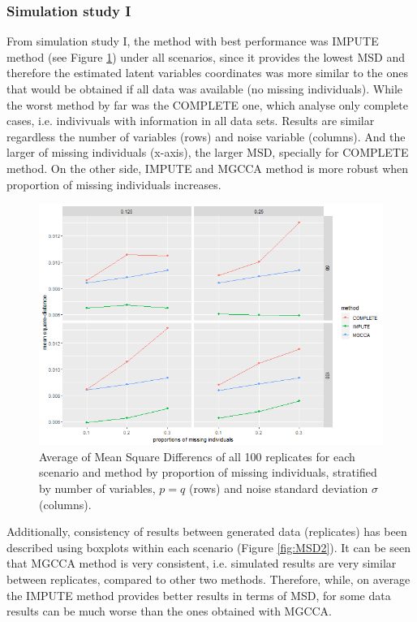 \documentclass[article]{jss}
\begin{document}
\subsubsection{Simulation study I}

From simulation study I, the method with best performance was IMPUTE method (see Figure \ref{fig:MSD1}) under all scenarios, since it provides the lowest MSD and therefore the estimated latent variables coordinates was more similar to the ones that would be obtained if all data was available (no missing individuals). While the worst method by far was the COMPLETE one, which analyse only complete cases, i.e. indivivuals with information in all data sets.
Results are similar regardless the number of variables (rows) and noise variable (columns). And the larger of missing individuals (x-axis), the larger MSD, specially for COMPLETE method. On the other side, IMPUTE and MGCCA method is more robust when proportion of missing individuals increases.


\begin{figure}[t!]
\centering
\includegraphics{./simulations/case1/plot1a}
\caption{\label{fig:MSD1} Average of Mean Square Differencs of all 100 replicates for each scenario and method by  proportion of missing individuals, stratified by number of variables, $p=q$ (rows) and noise standard deviation $\sigma$ (columns).}
\end{figure}


Additionally, consistency of results between generated data (replicates) has been described using boxplots within each scenario (Figure \ref{fig:MSD2}). It can be seen that MGCCA method is very consistent, i.e. simulated results are very similar between replicates, compared to other two methods. Therefore, while, on average the IMPUTE method provides better results in terms of MSD, for some data results can be much worse than the ones obtained with MGCCA.
\end{document}
